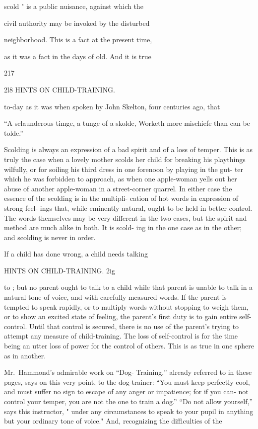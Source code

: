 \documentclass[
]{book}
\begin{document}
scold " is a public nuisance, against which the

civil authority may be invoked by the disturbed

neighborhood. This is a fact at the present time,

as it was a fact in the days of old. And it is true

217

2l8 HINTS ON CHILD-TRAINING.

to-day as it was when spoken by John Skelton, four centuries ago, that

``A sclaunderous timge, a tunge of a skolde, Worketh more mischiefe than can be tolde.''

Scolding is always an expression of a bad spirit and of a loss of temper. This is as truly the case when a lovely mother scolds her child for breaking his playthings wilfully, or for soiling his third dress in one forenoon by playing in the gut- ter which he was forbidden to approach, as when one apple-woman yells out her abuse of another apple-woman in a street-corner quarrel. In either case the essence of the scolding is in the multipli- cation of hot words in expression of strong feel- ings that, while eminently natural, ought to be held in better control. The words themselves may be very different in the two cases, but the spirit and method are much alike in both. It is scold- ing in the one case as in the other; and scolding is never in order.

If a child has done wrong, a child needs talking

HINTS ON CHILD-TRAINING. 2ig

to ; but no parent ought to talk to a child while that parent is unable to talk in a natural tone of voice, and with carefully measured words. If the parent is tempted to speak rapidly, or to multiply words without stopping to weigh them, or to show an excited state of feeling, the parent's first duty is to gain entire self-control. Until that control is secured, there is no use of the parent's trying to attempt any measure of child-training. The loss of self-control is for the time being an utter loss of power for the control of others. This is as true in one sphere as in another.

Mr.~Hammond's admirable work on ``Dog- Training,'' already referred to in these pages, says on this very point, to the dog-trainer: ``You must keep perfectly cool, and must suffer no sign to escape of any anger or impatience; for if you can- not control your temper, you are not the one to train a dog.'' ``Do not allow yourself,'' says this instructor, " under any circumstances to speak to your pupil in anything but your ordinary tone of voice." And, recognizing the difficulties of the
\end{document}
